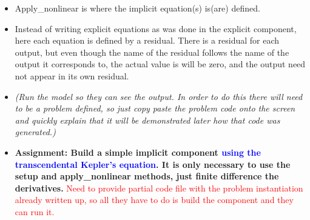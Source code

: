 \documentclass[12pt, letterpaper]{article}
\begin{document}
\begin{itemize}
\begin{itemize}
\begin{itemize}
				\end{itemize}
			\item Apply\_nonlinear is where the implicit equation(s) is(are) defined. 
			\item Instead of writing explicit equations as was done in the explicit component, here each equation is defined by a residual. There is a residual for each output, but even though the name of the residual follows the name of the output it corresponds to, the actual value is will be zero, and the output need not appear in its own residual.
			\item \textit{(Run the model so they can see the output. In order to do this there will need to be a problem defined, so just copy paste the problem code onto the screen and quickly explain that it will be demonstrated later how that code was generated.)}
			\item \textbf{Assignment: Build a simple implicit component \textcolor{blue}{using the transcendental Kepler's equation}. It is only necessary to use the setup and apply\_nonlinear methods, just finite difference the derivatives.} \textcolor{red}{Need to provide partial code file with the problem instantiation already written up, so all they have to do is build the component and they can run it.}
		\end{itemize}


\end{itemize}
\end{document}
